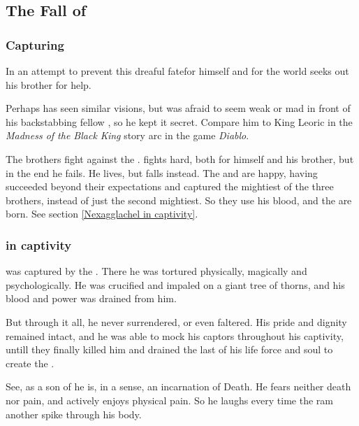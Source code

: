\subsection{The Fall of \Nexagglachel}





\subsubsection{Capturing \Nexagglachel}
In an attempt to prevent this dreaful fate\dash for himself and for the world\dash\Ishna{} seeks out his brother \Nexagglachel{} for help. 

Perhaps \Nexagglachel{} has seen similar visions, but was afraid to seem weak or mad in front of his backstabbing fellow \dragons, so he kept it secret. Compare him to King Leoric in the \emph{Madness of the Black King} story arc in the game \emph{Diablo}. 

The brothers fight against the \banes. \Ishnaruchaefir{} fights hard, both for himself and his brother, but in the end he fails. He lives, but \Nexagglachel{} falls instead. The \banes{} and \resphain{} are happy, having succeeded beyond their expectations and captured the mightiest of the three brothers, instead of just the second mightiest. So they use his blood, and the \satharioth{} are born. See section \ref{Nexagglachel in captivity}.





\subsubsection{\Nexagglachel{} in captivity}
\Nexagglachel{} was captured by the \banes{}. 
There he was tortured physically, magically and psychologically. 
He was crucified and impaled on a giant tree of thorns, and his blood and power was drained from him.

But through it all, he never surrendered, or even faltered. His pride and dignity remained intact, and he was able to mock his captors throughout his captivity, untill they finally killed him and drained the last of his life force and soul to create the \satharioth. 

See, as a son of \KhothSell{} he is, in a sense, an incarnation of Death. He fears neither death nor pain, and actively enjoys physical pain. So he laughs every time the \resphain{} ram another spike through his body.






